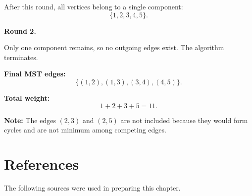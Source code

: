 \begin{ppexercises}
{After this round, all vertices belong to a single component:
\[
\{1,2,3,4,5\}.
\]

\textbf{Round 2.}

Only one component remains, so no outgoing edges exist.
The algorithm terminates.

\textbf{Final MST edges:}
\[
\{(1,2), (1,3), (3,4), (4,5)\}.
\]

\textbf{Total weight:}
\[
1 + 2 + 3 + 5 = 11.
\]

\textbf{Note:}
The edges $(2,3)$ and $(2,5)$ are not included because they would form cycles and are not minimum among competing edges.
}

\end{ppexercises}

\section*{References}

The following sources were used in preparing this chapter.

